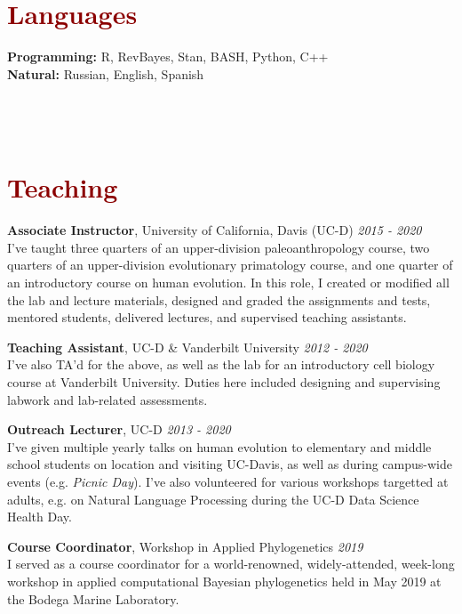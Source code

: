 \documentclass[11pt,margin,line]{resume}
\begin{document}
\begin{resume}
\section{\large\textcolor{DarkRed}{Languages}}

\textbf{Programming:} R, RevBayes, Stan, BASH, Python, C++\\
\textbf{Natural:} Russian, English, Spanish\\\\\\\\

\section{\large\textcolor{DarkRed}{Teaching}}

\textbf{Associate Instructor}, University of California, Davis (UC-D) \hfill \emph{2015  - 2020}\\
I’ve taught three quarters of an upper-division paleoanthropology course, two quarters of an upper-division evolutionary primatology course, and one quarter of an introductory course on human evolution. In this role, I created or modified all the lab and lecture materials, designed and graded the assignments and tests, mentored students, delivered lectures, and supervised teaching assistants.
\vspace{-1.5mm}

\textbf{Teaching Assistant}, UC-D \& Vanderbilt University \hfill \emph{2012  - 2020}\\
I've also TA'd for the above, as well as the lab for an introductory cell biology course at Vanderbilt University. Duties here included designing and supervising labwork and lab-related assessments.
\vspace{-1.5mm}

\textbf{Outreach Lecturer}, UC-D \hfill \emph{2013  - 2020}\\
I've given multiple yearly talks on human evolution to elementary and middle school students on location and visiting UC-Davis, as well as during campus-wide events (e.g. \emph{Picnic Day}). I've also volunteered for various workshops targetted at adults, e.g. on Natural Language Processing during the UC-D Data Science Health Day.
\vspace{-1.5mm}

\textbf{Course Coordinator}, Workshop in Applied Phylogenetics \hfill \emph{2019}\\
I served as a course coordinator for a world-renowned, widely-attended, week-long workshop in applied computational Bayesian phylogenetics held in May 2019 at the Bodega Marine Laboratory.
\vspace{-1.5mm}


\end{resume}
\end{document}
